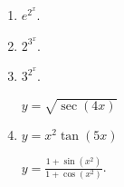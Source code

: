 \begin{multicols}{2}
\begin{enumerate}[ref={\fcProblemRef}]
\item $e^{2^x}$.


\item $2^{3^x}$.

\item $3^{2^x}$.

 \label{problemd/dx(sqrt(sec(4x)))}  $y = \sqrt{\sec (4x)}$

\item \label{problemd/dx(x^2tan(5x))} $y = x^2\tan (5x)$

 \label{problemd/dx((1+sin(x^2))/(1+cos(x^2)))}  $\displaystyle y = \frac{1+\sin \left(x^2\right)}{1+\cos \left(x^2\right)}$.


\end{enumerate}
\end{multicols}
